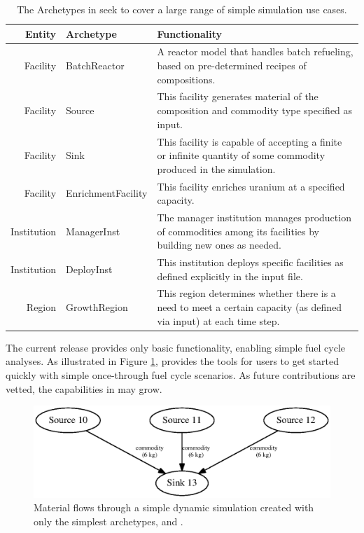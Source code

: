 \begin{table}[h]
\centering
\begin{tabularx}{\textwidth}{|r|l|X|}
\hline
\textbf{Entity} & \textbf{Archetype} & \textbf{Functionality} \\
\hline
Facility & BatchReactor & A reactor model that handles batch refueling, based on pre-determined recipes of compositions. \\
Facility & Source & This facility generates material of the composition and commodity type specified as input.  \\
Facility & Sink & This facility is capable of accepting a finite or infinite quantity of some commodity produced in the simulation. \\
Facility & EnrichmentFacility & This facility enriches uranium at a specified capacity. \\
Institution & ManagerInst & The manager institution manages production of commodities among its facilities by building new ones as needed. \\
Institution & DeployInst &  This institution deploys specific facilities as defined explicitly in the input file. \\
Region & GrowthRegion & This region determines whether there is a need to meet a certain capacity (as defined via input) at each time step. \\
\hline
\end{tabularx}
\caption{The Archetypes in \Cycamore seek to cover a large range of simple simulation use cases.}
\label{tab:cycamore}
\end{table}

The current \Cycamore release provides only
basic functionality, enabling simple fuel cycle analyses.
As illustrated in Figure \ref{fig:simplesim}, \Cycamore provides the tools for users
to get started quickly with simple
once-through fuel cycle scenarios. As future contributions are vetted, the capabilities in \Cycamore may grow.

\begin{figure}[htbp!]
\begin{center}
\includegraphics{./images/simplesim}
\end{center}
\caption{Material flows through a simple dynamic simulation created with only the simplest \Cycamore archetypes,  and .}
\label{fig:simplesim}
\end{figure}


